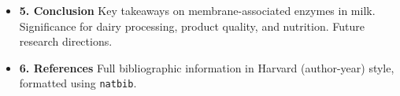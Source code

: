 \begin{itemize}
    \item \textbf{5. Conclusion}  
    \subitem Key takeaways on membrane-associated enzymes in milk.  
    \subitem Significance for dairy processing, product quality, and nutrition.  
    \subitem Future research directions.  

    \item \textbf{6. References}  
    \subitem Full bibliographic information in Harvard (author-year) style, formatted using \texttt{natbib}.  
\end{itemize}



